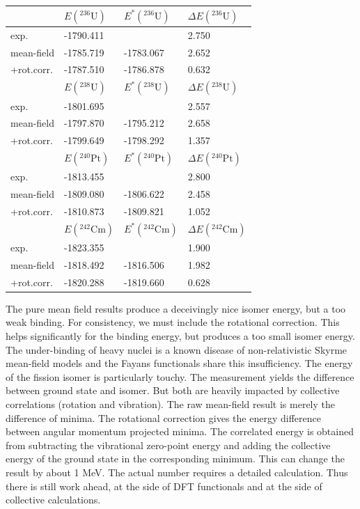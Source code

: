 \documentclass[12pt]{article}
\begin{document}
\begin{center}
\begin{tabular}{l|lll}
\hline
      & $E(^{236}\mathrm{U})$& $E^*(^{236}\mathrm{U})$&$\Delta E(^{236}\mathrm{U})$\\
\hline
exp.        &  -1790.411 &           &   2.750\\
mean-field  &  -1785.719 & -1783.067 &   2.652\\
+rot.corr.  &  -1787.510 & -1786.878 &   0.632\\
\hline
\hline
      & $E(^{238}\mathrm{U})$& $E^*(^{238}\mathrm{U})$&$\Delta E(^{238}\mathrm{U})$\\
\hline
exp.        &  -1801.695 &           &   2.557\\
mean-field  &  -1797.870 & -1795.212 &   2.658\\
+rot.corr.  &  -1799.649 & -1798.292 &   1.357\\
\hline
\hline
      & $E(^{240}\mathrm{Pt})$& $E^*(^{240}\mathrm{Pt})$&$\Delta E(^{240}\mathrm{Pt})$\\
\hline
exp.        &  -1813.455 &           &   2.800\\
mean-field  &  -1809.080 & -1806.622 &   2.458\\
+rot.corr.  &  -1810.873 & -1809.821 &   1.052\\
\hline
\hline
      & $E(^{242}\mathrm{Cm})$& $E^*(^{242}\mathrm{Cm})$&$\Delta E(^{242}\mathrm{Cm})$\\
\hline
exp.        &  -1823.355 &           &   1.900\\
mean-field  &  -1818.492 & -1816.506 &   1.982\\
+rot.corr.  &  -1820.288 & -1819.660 &   0.628\\
\hline
\end{tabular}
\end{center}

\bigskip

The pure mean field results produce a deceivingly nice isomer energy,
but a too weak binding. For consistency, we must include the
rotational correction. This helps significantly for the binding
energy, but produces a too small isomer energy.  The under-binding of
heavy nuclei is a known disease of non-relativistic Skyrme mean-field
models and the Fayans functionals share this insufficiency. 
The energy of the fission isomer is particularly touchy. The
measurement yields the difference between ground state and isomer. But
both are heavily impacted by collective correlations (rotation and
vibration). The raw mean-field result is merely the difference of
minima. The rotational correction gives the energy difference between
angular momentum projected minima. The correlated energy is obtained
from subtracting the vibrational zero-point energy and adding the
collective energy of the ground state in the corresponding minimum. 
This can change the result by about 1 MeV. The actual number requires
a detailed calculation. Thus there  is still work ahead, at the
side of DFT functionals and at the side of collective calculations.
\end{document}
